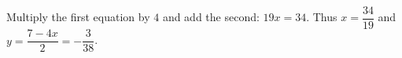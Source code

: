 Multiply the first equation by $4$ and add the second: $19x=34$. Thus $x=\dfrac{34}{19}$ and $y=\dfrac{7-4x}{2}=-\dfrac{3}{38}$.
